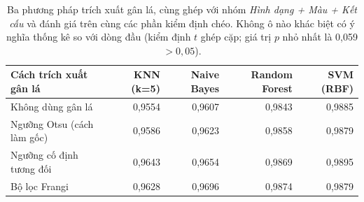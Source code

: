 \begin{table}[t]
\centering
\caption{Ba phương pháp trích xuất gân lá, cùng ghép với nhóm \emph{Hình dạng + Màu + Kết cấu} và đánh giá trên cùng các phần kiểm định chéo. Không ô nào khác biệt có ý nghĩa thống kê so với dòng đầu (kiểm định $t$ ghép cặp; giá trị $p$ nhỏ nhất là 0{,}059 $> 0{,}05$).}
\label{tab:vein}
\small
\begin{tabular}{l r r r r}
\toprule
Cách trích xuất gân lá & KNN (k=5) & Naive Bayes & Random Forest & SVM (RBF) \\
\midrule
Không dùng gân lá & 0{,}9554 & 0{,}9607 & 0{,}9843 & 0{,}9885 \\
Ngưỡng Otsu (cách làm gốc) & 0{,}9586 & 0{,}9623 & 0{,}9858 & 0{,}9879 \\
Ngưỡng cố định tương đối & 0{,}9643 & 0{,}9654 & 0{,}9869 & 0{,}9895 \\
Bộ lọc Frangi & 0{,}9628 & 0{,}9696 & 0{,}9874 & 0{,}9879 \\
\bottomrule
\end{tabular}
\end{table}
